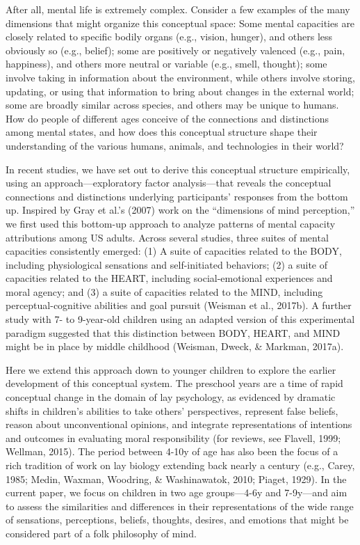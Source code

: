\documentclass[10pt, letterpaper]{article}
\begin{document}
After all, mental life is extremely complex. Consider a few examples of
the many dimensions that might organize this conceptual space: Some
mental capacities are closely related to specific bodily organs (e.g.,
vision, hunger), and others less obviously so (e.g., belief); some are
positively or negatively valenced (e.g., pain, happiness), and others
more neutral or variable (e.g., smell, thought); some involve taking in
information about the environment, while others involve storing,
updating, or using that information to bring about changes in the
external world; some are broadly similar across species, and others may
be unique to humans. How do people of different ages conceive of the
connections and distinctions among mental states, and how does this
conceptual structure shape their understanding of the various humans,
animals, and technologies in their world?

In recent studies, we have set out to derive this conceptual structure
empirically, using an approach---exploratory factor analysis---that
reveals the conceptual connections and distinctions underlying
participants' responses from the bottom up. Inspired by Gray et al.'s
(2007) work on the ``dimensions of mind perception,'' we first used this
bottom-up approach to analyze patterns of mental capacity attributions
among US adults. Across several studies, three suites of mental
capacities consistently emerged: (1) A suite of capacities related to
the BODY, including physiological sensations and self-initiated
behaviors; (2) a suite of capacities related to the HEART, including
social-emotional experiences and moral agency; and (3) a suite of
capacities related to the MIND, including perceptual-cognitive abilities
and goal pursuit (Weisman et al., 2017b). A further study with 7- to
9-year-old children using an adapted version of this experimental
paradigm suggested that this distinction between BODY, HEART, and MIND
might be in place by middle childhood (Weisman, Dweck, \& Markman,
2017a).

Here we extend this approach down to younger children to explore the
earlier development of this conceptual system. The preschool years are a
time of rapid conceptual change in the domain of lay psychology, as
evidenced by dramatic shifts in children's abilities to take others'
perspectives, represent false beliefs, reason about unconventional
opinions, and integrate representations of intentions and outcomes in
evaluating moral responsibility (for reviews, see Flavell, 1999;
Wellman, 2015). The period between 4-10y of age has also been the focus
of a rich tradition of work on lay biology extending back nearly a
century (e.g., Carey, 1985; Medin, Waxman, Woodring, \& Washinawatok,
2010; Piaget, 1929). In the current paper, we focus on children in two
age groups---4-6y and 7-9y---and aim to assess the similarities and
differences in their representations of the wide range of sensations,
perceptions, beliefs, thoughts, desires, and emotions that might be
considered part of a folk philosophy of mind.
\end{document}
